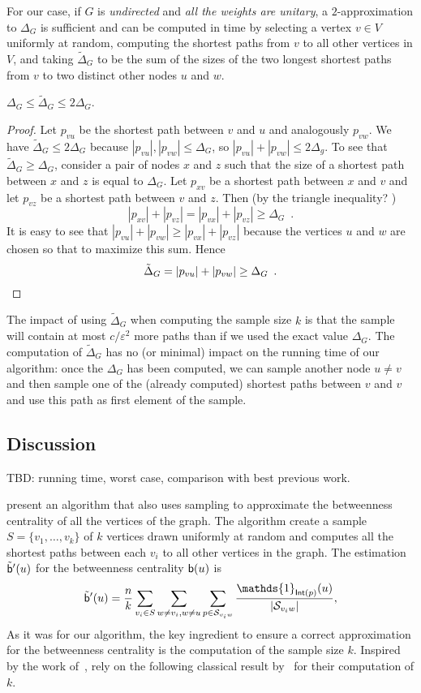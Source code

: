 For our case, if $G$ is \emph{undirected} and \emph{all the weights are
unitary}, a $2$-approximation to $\Delta_G$ is sufficient and can be computed in
time \XXX by selecting a vertex $v\in V$ uniformly at random, computing the
shortest paths from $v$ to all other vertices in $V$, and taking
$\tilde\Delta_G$ to be the sum of the sizes of the two longest shortest paths
from $v$ to two distinct other nodes $u$ and $w$. 

\begin{lemma}\label{lem:diam}
  $\Delta_G\le\tilde\Delta_G\le 2\Delta_G$.
\end{lemma}
\begin{proof}
  Let $p_{vu}$ be the shortest path between $v$ and $u$ and analogously
  $p_{vw}$. We have $\tilde\Delta_G\le 2\Delta_G$ because
  $|p_{vu}|,|p_{vw}|\le\Delta_G$, so $|p_{vu}|+|p_{vw}|\le 2\Delta_g$. To see
  that $\tilde\Delta_G\ge\Delta_G$, consider a pair of nodes $x$ and $z$ such
  that the size of a shortest path between $x$ and $z$ is equal to $\Delta_G$.
  Let $p_{xv}$ be a shortest path between $x$ and $v$ and let $p_{vz}$ be a
  shortest path between $v$ and $z$. 
  Then (by the triangle inequality? \XXX)
  \[
  |p_{xv}|+|p_{vz}|=|p_{vx}|+|p_{vz}|\ge\Delta_G\enspace.
  \]
  It is easy to see that $|p_{vu}|+|p_{vw}|\ge|p_{vx}|+|p_{vz}|$ because the
  vertices $u$ and $w$ are chosen so that to maximize this sum. Hence
  \[
  \tilde\Delta_G = |p_{vu}|+|p_{vw}| \ge\Delta_G\enspace.\qedhere
  \]
\end{proof}

The impact of using $\tilde\Delta_G$ when computing the sample size $k$ is that
the sample will contain at most $c/\varepsilon^2$ more paths than if we used the
exact value $\Delta_G$. The computation of $\tilde\Delta_G$ has no (\XXX or
minimal) impact on the running time of our algorithm: once the $\Delta_G$ has
been computed, we can sample another node $u\neq v$ and then sample one of the
(already computed) shortest paths between $v$ and $v$ and use this path as first
element of the sample.

\subsection{Discussion}\label{sec:discussion}
\XXX TBD: running time, worst case, comparison with best previous work.

\citet{BrandesP07} present an algorithm that also uses sampling to approximate
the betweenness centrality of all the vertices of the graph. The algorithm
create a sample $S=\{v_1,\dotsc,v_k\}$ of $k$ vertices drawn uniformly at random 
and computes all the shortest paths between each $v_i$ to all other vertices in
the graph. The estimation $\tilde{\mathsf{b}}'(u)$ for the betweenness centrality
$\mathsf{b}(u)$ is
\[ 
\tilde\betw'(u)= \frac{n}{k}\sum_{v_i\in S}\sum_{w\neq v_i,w\neq
u}\sum_{p\in\mathcal{S}_{v_iw}}\frac{\mathds{1}_{\mathsf{Int}(p)}(u)}{|\mathcal{S}_{v_iw}|},
\]
As it was for our algorithm, the key ingredient to ensure a correct
approximation for the betweenness centrality is the computation of the sample
size $k$. Inspired by the work of~\citet{EppsteinW04}, \citet{BrandesP07} rely
on the following classical result by~\citet{Hoeffding63} for their computation
of $k$.

